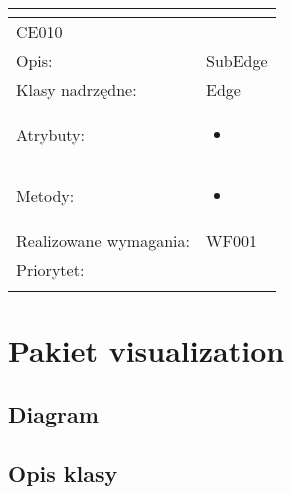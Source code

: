 \documentclass[a4paper,10pt]{article}
\begin{document}
\begin{center}
\begin{longtable}{|m{3cm}|m{9cm}|}
\multicolumn{2}{c}{} \\
 \hline

CE010 &  \\ \hline
Opis: & SubEdge    \\ \hline
Klasy nadrzędne: & Edge    \\ \hline
Atrybuty: & \begin{itemize}
 \item 
\end{itemize}
 \\ \hline
Metody: & \begin{itemize}
 \item 
\end{itemize}
  \\ \hline
Realizowane wymagania: & WF001 \\ \hline
Priorytet: &  \\ \hline

\multicolumn{2}{c}{} \\
 \hline


\end{longtable}

\end{center}

\section{Pakiet visualization }

\subsection{Diagram}

\subsection{Opis klasy}
\end{document}
